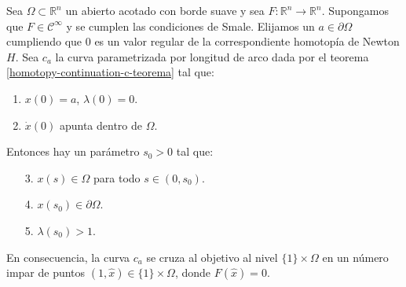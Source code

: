 \begin{theorem}
	Sea $\Omega \subset \mathbb{R}^n$ un abierto acotado con borde suave y sea $F: \mathbb{R}^n \longrightarrow \mathbb{R}^n$. Supongamos que $F \in \mathcal{C}^\infty$ y se cumplen las condiciones de Smale. Elijamos un $a \in \partial \Omega$ cumpliendo que $0$ es un valor regular de la correspondiente homotopía de Newton $H$. Sea $c_a$ la curva parametrizada por longitud de arco dada por el teorema \ref{homotopy-continuation-c-teorema} tal que:
	\begin{enumerate}
		\item $x(0) = a$, $\lambda(0) = 0$.
		\item $\dot{x}(0)$ apunta dentro de $\Omega$.
	\end{enumerate}
	Entonces hay un parámetro $s_0 > 0$ tal que:
	\begin{enumerate}
		\item[3.] $x(s) \in \Omega$ para todo $s \in (0,s_0)$.
		\item[4.] $x(s_0) \in \partial \Omega$.
		\item[5.] $\lambda(s_0) > 1$.
	\end{enumerate}
	En consecuencia, la curva $c_a$ se cruza al objetivo al nivel $\{1\}\times\Omega$ en un número impar de puntos $(1,\hat{x}) \in \{1\}\times\Omega$, donde $F(\hat{x}) = 0$.
\end{theorem}
